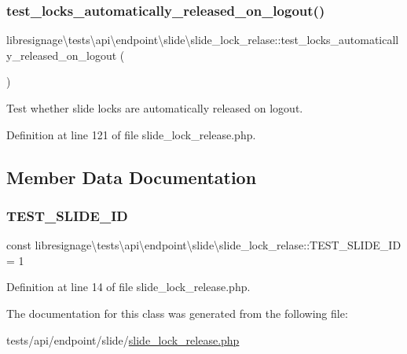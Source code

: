 \subsubsection{\texorpdfstring{test\+\_\+locks\+\_\+automatically\+\_\+released\+\_\+on\+\_\+logout()}{test\_locks\_automatically\_released\_on\_logout()}}
{\footnotesize\ttfamily libresignage\textbackslash{}tests\textbackslash{}api\textbackslash{}endpoint\textbackslash{}slide\textbackslash{}slide\+\_\+lock\+\_\+relase\+::test\+\_\+locks\+\_\+automatically\+\_\+released\+\_\+on\+\_\+logout (\begin{DoxyParamCaption}{ }\end{DoxyParamCaption})}

Test whether slide locks are automatically released on logout. 

Definition at line 121 of file slide\+\_\+lock\+\_\+release.\+php.



\subsection{Member Data Documentation}
\mbox{\label{classlibresignage_1_1tests_1_1api_1_1endpoint_1_1slide_1_1slide__lock__relase_aa6d4b1dd627dde256a6888774bde178d}} 
\subsubsection{\texorpdfstring{T\+E\+S\+T\+\_\+\+S\+L\+I\+D\+E\+\_\+\+ID}{TEST\_SLIDE\_ID}}
{\footnotesize\ttfamily const libresignage\textbackslash{}tests\textbackslash{}api\textbackslash{}endpoint\textbackslash{}slide\textbackslash{}slide\+\_\+lock\+\_\+relase\+::\+T\+E\+S\+T\+\_\+\+S\+L\+I\+D\+E\+\_\+\+ID = \textquotesingle{}1\textquotesingle{}}



Definition at line 14 of file slide\+\_\+lock\+\_\+release.\+php.



The documentation for this class was generated from the following file\+:\begin{DoxyCompactItemize}
\item 
tests/api/endpoint/slide/\hyperlink{tests_2api_2endpoint_2slide_2slide__lock__release_8php}{slide\+\_\+lock\+\_\+release.\+php}\end{DoxyCompactItemize}
